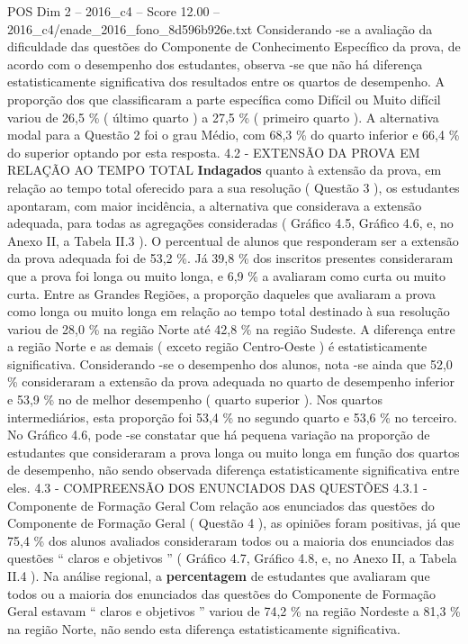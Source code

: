 \begin{textsample}{POS Dim 2 – 2016\_c4 – Score 12.00 – 2016\_c4/enade\_2016\_fono\_8d596b926e.txt}
Considerando -se a avaliação da dificuldade das questões do Componente de Conhecimento Específico da prova, de acordo com o desempenho dos estudantes, observa -se que não há diferença estatisticamente significativa dos resultados entre os quartos de desempenho.
A proporção dos que classificaram a parte específica como Difícil ou Muito difícil variou de 26,5 \% ( último quarto ) a 27,5 \% ( primeiro quarto ).
A alternativa modal para a Questão 2 foi o grau Médio, com 68,3 \% do quarto inferior e 66,4 \% do superior optando por esta resposta. 4.2 - EXTENSÃO DA PROVA EM RELAÇÃO AO TEMPO TOTAL \textbf{Indagados} quanto à extensão da prova, em relação ao tempo total oferecido para a sua resolução ( Questão 3 ), os estudantes apontaram, com maior incidência, a alternativa que considerava a extensão adequada, para todas as agregações consideradas ( Gráfico 4.5, Gráfico 4.6, e, no Anexo II, a Tabela II.3 ).
O percentual de alunos que responderam ser a extensão da prova adequada foi de 53,2 \%.
Já 39,8 \% dos inscritos presentes consideraram que a prova foi longa ou muito longa, e 6,9 \% a avaliaram como curta ou muito curta.
Entre as Grandes Regiões, a proporção daqueles que avaliaram a prova como longa ou muito longa em relação ao tempo total destinado à sua resolução variou de 28,0 \% na região Norte até 42,8 \% na região Sudeste.
A diferença entre a região Norte e as demais ( exceto região Centro-Oeste ) é estatisticamente significativa.
Considerando -se o desempenho dos alunos, nota -se ainda que 52,0 \% consideraram a extensão da prova adequada no quarto de desempenho inferior e 53,9 \% no de melhor desempenho ( quarto superior ).
Nos quartos intermediários, esta proporção foi 53,4 \% no segundo quarto e 53,6 \% no terceiro.
No Gráfico 4.6, pode -se constatar que há pequena variação na proporção de estudantes que consideraram a prova longa ou muito longa em função dos quartos de desempenho, não sendo observada diferença estatisticamente significativa entre eles. 4.3 - COMPREENSÃO DOS ENUNCIADOS DAS QUESTÕES 4.3.1 - Componente de Formação Geral Com relação aos enunciados das questões do Componente de Formação Geral ( Questão 4 ), as opiniões foram positivas, já que 75,4 \% dos alunos avaliados consideraram todos ou a maioria dos enunciados das questões “ claros e objetivos ” ( Gráfico 4.7, Gráfico 4.8, e, no Anexo II, a Tabela II.4 ).
Na análise regional, a \textbf{percentagem} de estudantes que avaliaram que todos ou a maioria dos enunciados das questões do Componente de Formação Geral estavam “ claros e objetivos ” variou de 74,2 \% na região Nordeste a 81,3 \% na região Norte, não sendo esta diferença estatisticamente significativa.

\end{textsample}
